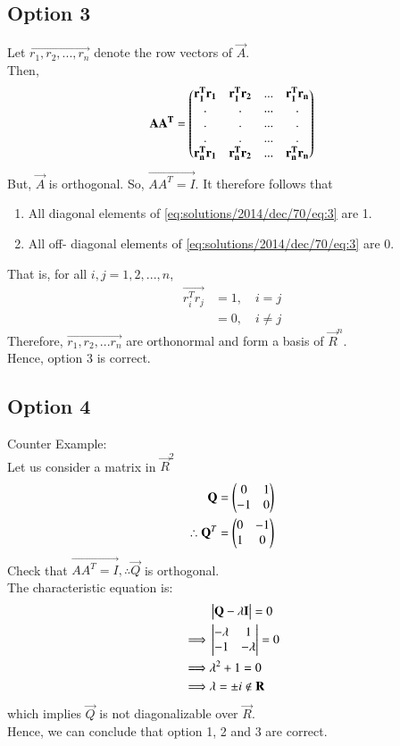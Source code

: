 \subsection{Option 3}
Let $\vec{r_1, r_2, ..., r_n}$ denote the row vectors of $\vec A$.\\
Then, 
\begin{align}
    \mathbf{AA^T} = \begin{pmatrix}\mathbf{r_1^Tr_1} & \mathbf{r_1^T r_2} & ... & \mathbf{r_1^Tr_n}\\ . & . &... & .\\ . & . &... & .\\. & . &... & .\\ \mathbf{r_n^Tr_1} & \mathbf{r_n^Tr_2} & ... & \mathbf{r_n^T r_n}\end{pmatrix} \label{eq:solutions/2014/dec/70/eq:3}
\end{align}
But, $\vec A $ is orthogonal. So, $\vec {AA^T = I}$. It therefore follows that
\begin{enumerate}
    \item All diagonal elements of \eqref{eq:solutions/2014/dec/70/eq:3} are 1.
    \item All off- diagonal elements of \eqref{eq:solutions/2014/dec/70/eq:3} are 0.
\end{enumerate}
That is, for all $i, j =1, 2, ..., n $, 
\begin{align}
    \vec{r_i^T r_j} &= 1 ,\quad  i=j\\
    &= 0 , \quad i\neq j
\end{align}
Therefore, $\vec{r_1, r_2, ... r_n}$ are orthonormal and form a basis of $\vec R^n$.\\
Hence, option 3 is correct.
\subsection{Option 4}
Counter Example:\\
Let us consider a matrix  in $ \vec R^2 $
\begin{align}
    \mathbf Q= \begin{pmatrix} 0 & 1 \\-1 & 0\end{pmatrix}\\
    \therefore \mathbf Q^T =\begin{pmatrix} 0 & -1\\1 & 0\end{pmatrix}
\end{align}
Check that $\vec{AA^T= I},  \therefore \vec Q$ is orthogonal. \\
The characteristic equation is:
\begin{align}
    &\begin{vmatrix}\mathbf Q- \lambda\mathbf I\end{vmatrix}=0\\
    \implies & \begin{vmatrix}-\lambda & 1\\ -1 & -\lambda\end{vmatrix}=0\\
    \implies & \lambda^2 + 1 = 0\\
    \implies & \lambda= \pm i \notin \mathbf R
\end{align}
which implies $\vec Q$ is not diagonalizable over $\vec R$.\\

Hence, we can conclude that option 1, 2 and 3 are correct.
